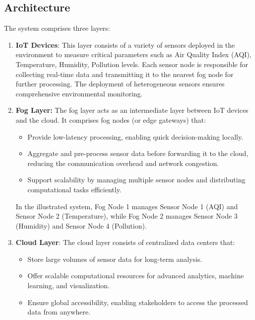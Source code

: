 \documentclass[conference]{IEEEtran}
\begin{document}
	\subsection{Architecture}
	The system comprises three layers:
	\begin{enumerate}
		\item \textbf{IoT Devices}: This layer consists of a variety of sensors deployed in the environment to measure critical parameters such as Air Quality Index (AQI), Temperature, Humidity, Pollution levels. Each sensor node is responsible for collecting real-time data and transmitting it to the nearest fog node for further processing. The deployment of heterogeneous sensors ensures comprehensive environmental monitoring.
		\item \textbf{Fog Layer:}
		The fog layer acts as an intermediate layer between IoT devices and the cloud. It comprises fog nodes (or edge gateways) that:
		\begin{itemize}
			\item Provide low-latency processing, enabling quick decision-making locally.
			\item Aggregate and pre-process sensor data before forwarding it to the cloud, reducing the communication overhead and network congestion.
			\item Support scalability by managing multiple sensor nodes and distributing computational tasks efficiently.
		\end{itemize}
		In the illustrated system, Fog Node 1 manages Sensor Node 1 (AQI) and Sensor Node 2 (Temperature), while Fog Node 2 manages Sensor Node 3 (Humidity) and Sensor Node 4 (Pollution).
		\item \textbf{Cloud Layer}: The cloud layer consists of centralized data centers that:
		\begin{itemize}
			\item Store large volumes of sensor data for long-term analysis.
			\item Offer scalable computational resources for advanced analytics, machine learning, and visualization.
			\item Ensure global accessibility, enabling stakeholders to access the processed data from anywhere.
		\end{itemize}
	\end{enumerate}
	
\end{document}
